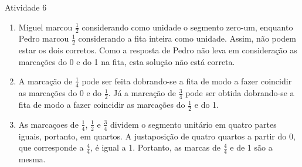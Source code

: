 \begin{multicols}{2}
\begin{resposta*}{Atividade 6}

\begin{enumerate} [\quad a)] %
    \item       Miguel marcou       $\frac{1}{2}$       considerando como unidade o segmento zero-um, enquanto Pedro marcou       $\frac{1}{2}$       considerando a fita inteira como unidade. Assim, não podem estar os dois corretos. Como a resposta de Pedro não leva em consideração as marcações do 0 e do 1 na fita, esta solução não está correta.
    
    \item       A marcação de       $\frac{1}{4}$       pode ser feita dobrando-se a fita de modo a fazer coincidir as marcações do 0 e do        $\frac{1}{2}$. Já a marcação de       $\frac{3}{4}$     pode ser obtida dobrando-se a fita de modo a fazer coincidir as marcações do       $\frac{1}{2}$       e do 1. 


    \item       As marcaçoes de       $\frac{1}{4}$,        $\frac{1}{2}$       e       $\frac{3}{4}$       dividem o segmento unitário em quatro partes iguais, portanto, em quartos. A justaposição de quatro quartos a partir do 0, que corresponde a       $\frac{4}{4}$, é igual a 1.  Portanto, as marcas de       $\frac{4}{4}$       e de 1 são a mesma.
 
    

\end{enumerate}
\end{resposta*}
\end{multicols}
